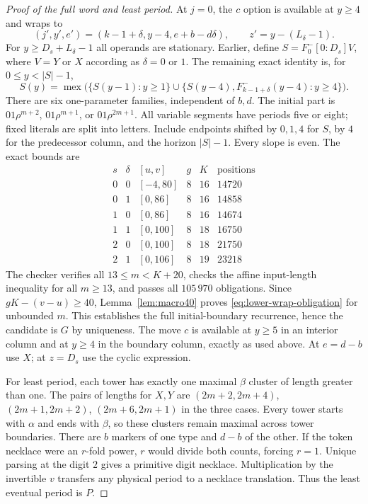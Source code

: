 \documentclass[11pt]{article}
\theoremstyle{remark}\newtheorem{remark}[theorem]{Remark}
\DeclareMathOperator{\mex}{mex}
\begin{document}
\begin{proof}[Proof of the full word and least period]
At $j=0$, the $c$ option is available at $y\ge4$ and wraps to
\[
 (j',y',e')=(k-1+\delta,y-4,e+b-d\delta),\qquad
 z'=y-(L_\delta-1).
\]
For $y\ge D_s+L_\delta-1$ all operands are stationary. Earlier, define
$S=F^-_0[0:D_s]V$, where $V=Y$ or $X$ according as $\delta=0$ or $1$.
The remaining exact identity is, for $0\le y<|S|-1$,
\begin{equation}\label{eq:lower-wrap-obligation}
 S(y)=\mex\bigl(\{S(y-1):y\ge1\}\cup
 \{S(y-4),F^-_{k-1+\delta}(y-4):y\ge4\}\bigr).
\end{equation}
There are six one-parameter families, independent of $b,d$.
The initial part is $01\rho^{m+2}$, $01\rho^{m+1}$, or
$01\rho^{2m+1}$. All variable segments have periods five or eight;
fixed literals are split into letters. Include endpoints shifted by
$0,1,4$ for $S$, by $4$ for the predecessor column, and the horizon
$|S|-1$. Every slope is even. The exact bounds are
\[
\begin{array}{c|c|c|c|c|r}
s&\delta&[u,v]&g&K&\text{positions}\\\hline
0&0&[-4,80]&8&16&14720\\
0&1&[0,86]&8&16&14858\\
1&0&[0,86]&8&16&14674\\
1&1&[0,100]&8&18&16750\\
2&0&[0,100]&8&18&21750\\
2&1&[0,106]&8&19&23218
\end{array}
\]
The checker  verifies all
$13\le m<K+20$, checks the affine input-length inequality for all
$m\ge13$, and passes all $105\,970$ obligations. Since
$gK-(v-u)\ge40$, Lemma~\ref{lem:macro40} proves
\eqref{eq:lower-wrap-obligation} for unbounded $m$.
This establishes the full initial-boundary recurrence, hence the
candidate is $G$ by uniqueness. The move $c$ is available at $y\ge5$
in an interior column and at $y\ge4$ in the boundary column, exactly as
used above. At $e=d-b$ use $X$; at $z=D_s$ use the cyclic expression.

For least period, each tower has exactly one maximal $\beta$ cluster of
length greater than one. The pairs of lengths for $X,Y$ are
$(2m+2,2m+4)$, $(2m+1,2m+2)$, $(2m+6,2m+1)$ in the three cases.
Every tower starts with $\alpha$ and ends with $\beta$, so these clusters
remain maximal across tower boundaries. There are $b$ markers of one
type and $d-b$ of the other. If the token necklace were an $r$-fold power,
$r$ would divide both counts, forcing $r=1$. Unique parsing at the digit
$2$ gives a primitive digit necklace. Multiplication by the invertible
$v$ transfers any physical period to a necklace translation. Thus the
least eventual period is $P$.
\end{proof}
\end{document}
